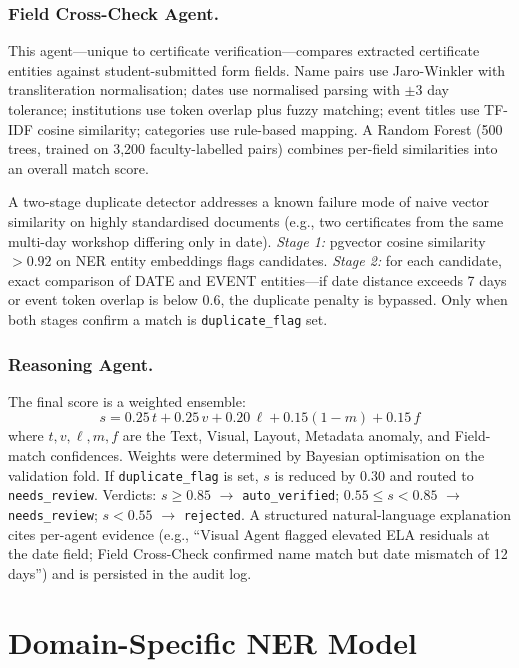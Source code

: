 \documentclass[runningheads]{llncs}
\begin{document}
\subsubsection{Field Cross-Check Agent.} This agent---unique to certificate verification---compares extracted certificate entities against student-submitted form fields. Name pairs use Jaro-Winkler with transliteration normalisation; dates use normalised parsing with $\pm 3$ day tolerance; institutions use token overlap plus fuzzy matching; event titles use TF-IDF cosine similarity; categories use rule-based mapping. A Random Forest (500 trees, trained on 3{,}200 faculty-labelled pairs) combines per-field similarities into an overall match score.

A two-stage duplicate detector addresses a known failure mode of naive vector similarity on highly standardised documents (e.g., two certificates from the same multi-day workshop differing only in date). \textit{Stage 1:} pgvector cosine similarity $> 0.92$ on NER entity embeddings flags candidates. \textit{Stage 2:} for each candidate, exact comparison of DATE and EVENT entities---if date distance exceeds 7 days or event token overlap is below 0.6, the duplicate penalty is bypassed. Only when both stages confirm a match is \texttt{duplicate\_flag} set.

\subsubsection{Reasoning Agent.} The final score is a weighted ensemble:
\begin{equation}
s = 0.25\,t + 0.25\,v + 0.20\,\ell + 0.15(1 - m) + 0.15\,f
\label{eq:ensemble}
\end{equation}
where $t, v, \ell, m, f$ are the Text, Visual, Layout, Metadata anomaly, and Field-match confidences. Weights were determined by Bayesian optimisation on the validation fold. If \texttt{duplicate\_flag} is set, $s$ is reduced by 0.30 and routed to \texttt{needs\_review}. Verdicts: $s \geq 0.85$ $\rightarrow$ \texttt{auto\_verified}; $0.55 \leq s < 0.85$ $\rightarrow$ \texttt{needs\_review}; $s < 0.55$ $\rightarrow$ \texttt{rejected}. A structured natural-language explanation cites per-agent evidence (e.g., ``Visual Agent flagged elevated ELA residuals at the date field; Field Cross-Check confirmed name match but date mismatch of 12 days'') and is persisted in the audit log.

\section{Domain-Specific NER Model}
\label{sec:ner}
\end{document}
